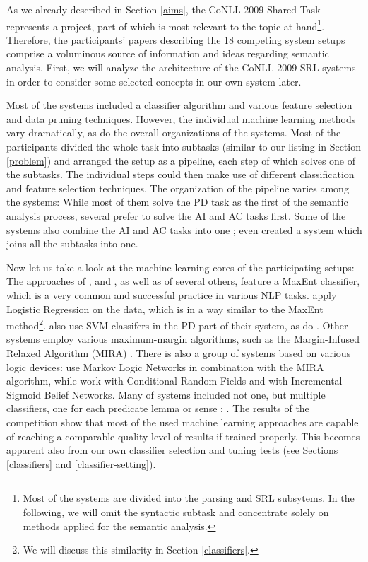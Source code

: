 \documentclass[12pt,notitlepage]{report}
\begin{document}
As we already described in Section \ref{aims}, the CoNLL 2009 Shared Task represents a project, part of which is most relevant to the topic at hand\footnote{Most of the systems are divided into the parsing and SRL subsytems. In the following, we will omit the syntactic subtask and concentrate solely on methods applied for the semantic analysis.}. Therefore, the participants' papers describing the 18 competing system setups comprise a voluminous source of information and ideas regarding semantic analysis. First, we will analyze the architecture of the CoNLL 2009 SRL systems in order to consider some selected concepts in our own system later. 

Most of the systems included a classifier algorithm and various feature selection and data pruning techniques. However, the individual machine learning methods vary dramatically, as do the overall organizations of the systems. Most of the participants divided the whole task into subtasks (similar to our listing in Section \ref{problem}) and arranged the setup as a pipeline, each step of which solves one of the subtasks. The individual steps could then make use of different classification and feature selection techniques. The organization of the pipeline varies among the systems: While most of them solve the PD task as the first of the semantic analysis process, several \citep{bohnet09,zhao09} prefer to solve the AI and AC tasks first. Some of the systems also combine the AI and AC tasks into one \citep{che09,nugues09}; \citet{meza-ruiz09} even created a system which joins all the subtasks into one. 

Now let us take a look at the machine learning cores of the participating setups: The approaches of \citet{zhao09}, \citet{che09} and \citet{chen09}, as well as of several others, feature a MaxEnt classifier, which is a very common and successful practice in various NLP tasks. \citet{nugues09} apply Logistic Regression on the data, which is in a way similar to the MaxEnt method\footnote{We will discuss this similarity in Section \ref{classifiers}.}. \citet{che09} also use SVM classifers in the PD part of their system, as do \citet{tackstrom09}. Other systems \citep{bohnet09,asahara09} employ various maximum-margin algorithms, such as the Margin-Infused Relaxed Algorithm (MIRA) \citep{crammer03}. There is also a group of systems based on various logic devices: \citet{meza-ruiz09} use Markov Logic Networks in combination with the MIRA algorithm, while \citet{moreau09} work with Conditional Random Fields and \citet{merlo09} with Incremental Sigmoid Belief Networks. Many of systems included not one, but multiple classifiers, one for each predicate lemma or sense \citep{che09}; \citep{nugues09}. The results of the competition show that most of the used machine learning approaches are capable of reaching a comparable quality level of results if trained properly. This becomes apparent also from our own classifier selection and tuning tests (see Sections \ref{classifiers} and \ref{classifier-setting}).
\end{document}
